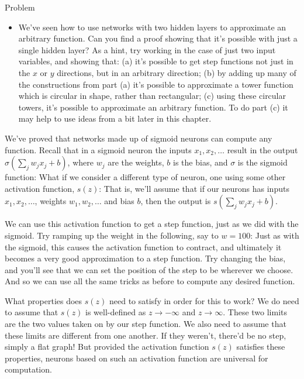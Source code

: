 \begin{exerciseBox}{Problem}


\begin{itemize}

\item We've seen how to use networks with two hidden layers to approximate an arbitrary function. Can you find a proof showing that it's possible with just a single hidden layer? As a hint, try working in the case of just two input variables, and showing that: (a) it's possible to get step functions not just in the $x$ or $y$ directions, but in an arbitrary direction; (b) by adding up many of the constructions from part (a) it's possible to approximate a tower function which is circular in shape, rather than rectangular; (c) using these circular towers, it's possible to approximate an arbitrary function. To do part (c) it may help to use ideas from a bit later in this chapter.

\end{itemize}

\end{exerciseBox}





We've proved that networks made up of sigmoid neurons can compute any function. Recall that in a sigmoid neuron the inputs $x_1, x_2, \ldots$ result in the output $\sigma(\sum_j w_j x_j + b)$, where $w_j$ are the weights, $b$ is the bias, and $\sigma$ is the sigmoid function: What if we consider a different type of neuron, one using some other activation function, $s(z)$: That is, we'll assume that if our neurons has inputs $x_1, x_2, \ldots$, weights $w_1, w_2, \ldots$ and bias $b$, then the output is $s(\sum_j w_j x_j + b)$.


We can use this activation function to get a step function, just as we did with the sigmoid. Try ramping up the weight in the following, say to $w = 100$: Just as with the sigmoid, this causes the activation function to contract, and ultimately it becomes a very good approximation to a step function. Try changing the bias, and you'll see that we can set the position of the step to be wherever we choose. And so we can use all the same tricks as before to compute any desired function.


What properties does $s(z)$ need to satisfy in order for this to work? We do need to assume that $s(z)$ is well-defined as $z \rightarrow -\infty$ and $z \rightarrow \infty$. These two limits are the two values taken on by our step function. We also need to assume that these limits are different from one another. If they weren't, there'd be no step, simply a flat graph! But provided the activation function $s(z)$ satisfies these properties, neurons based on such an activation function are universal for computation.



